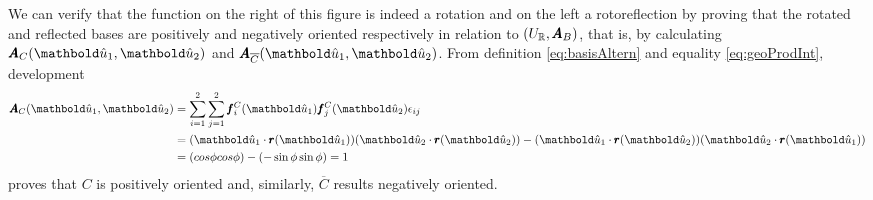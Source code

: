 \begin{figure}[!ht]
\centering
\begin{center}
\scalebox{.72}{}
\end{center}
\label{fg:rotoReflex}
\end{figure}
We can verify that the function on the right of this figure is indeed a rotation and on the left a rotoreflection by proving that the rotated and reflected bases are positively and negatively oriented respectively in relation to $(U_{\mathbb{R}},\pmb{A}_B)$, that is, by calculating $\fua{\tnr{A}_C}{\vun{u}_1,\vun{u}_2}$ and $\fua{\tnr{A}_{\overline{C}}}{\vun{u}_1,\vun{u}_2}$. From definition \eqref{eq:basisAltern} and equality \eqref{eq:geoProdInt}, development
\begin{align*}
\fua{\tnr{A}_{C}}{\vun{u}_1,\vun{u}_2}&=\sum_{i=1}^2\sum_{j=1}^2\fua{\vtf{f}^\con{C}_{i}}{\vun{u}_1}\fua{\vtf{f}^\con{C}_{j}}{\vun{u}_2}\epsilon_{ij}\\
&=(\vun{u}_1\cdot\fua{\vtf{r}}{\vun{u}_1})(\vun{u}_2\cdot\fua{\vtf{r}}{\vun{u}_2})-(\vun{u}_1\cdot\fua{\vtf{r}}{\vun{u}_2})(\vun{u}_2\cdot\fua{\vtf{r}}{\vun{u}_1})\\
&=(cos\phi cos\phi) - (-\sin\phi\sin\phi)=1
\end{align*}
proves that $C$ is positively oriented and, similarly, $\overline{C}$ results negatively oriented.


